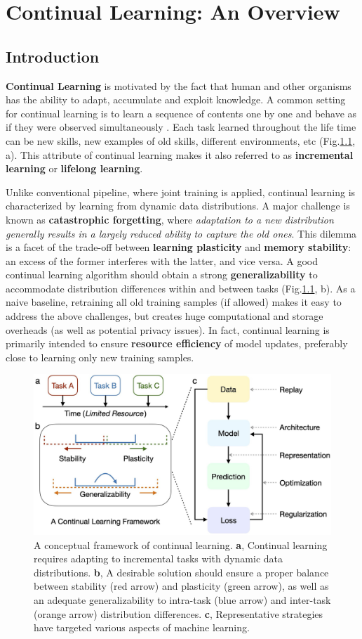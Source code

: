 \chapter{Continual Learning: An Overview}
\section{Introduction}
\textbf{Continual Learning} is motivated by the fact that human and other organisms has the ability to adapt, accumulate and exploit knowledge. A common setting for continual learning is to learn a sequence of contents one by one and behave as if they were observed simultaneously \citep{wang2023comprehensive}. Each task learned throughout the life time can be new skills, new examples of old skills, different environments, etc (Fig.\ref{fig:cl_1}, a). This attribute of continual learning makes it also referred to as \textbf{incremental learning} or \textbf{lifelong learning}.

Unlike conventional pipeline, where joint training is applied, continual learning is characterized by learning from dynamic data distributions. A major challenge is known as \textbf{catastrophic forgetting}, where \textit{adaptation to a new distribution generally results in a largely reduced ability to capture the old ones}. This dilemma is a facet of the trade-off between \textbf{learning plasticity} and \textbf{memory stability}: an excess of the former interferes with the latter, and vice versa. A good continual learning algorithm should obtain a strong \textbf{generalizability} to accommodate distribution differences within and between tasks (Fig.\ref{fig:cl_1}, b). As a naive baseline, retraining all old training samples (if allowed) makes it easy to address the above challenges, but creates huge computational and storage overheads (as well as potential privacy issues). In fact, continual learning is primarily intended to ensure \textbf{resource efficiency} of model updates, preferably close to learning only new training samples.

\begin{figure}[H]
    \centering
    \includegraphics[width=0.7\linewidth]{imgs/continual_learning/cl_1.png}
    \caption{A conceptual framework of continual learning. \textbf{a}, Continual learning requires adapting to incremental tasks with dynamic data distributions. \textbf{b}, A desirable solution should ensure a proper balance between stability (red arrow) and plasticity (green arrow), as well as an adequate generalizability to intra-task (blue arrow) and inter-task (orange arrow) distribution differences. \textbf{c}, Representative strategies have targeted various aspects of machine learning.}
    \label{fig:cl_1}
\end{figure}

